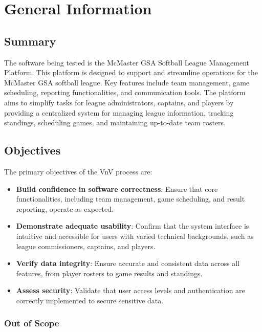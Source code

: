 \documentclass[12pt, titlepage]{article}
\begin{document}
\section{General Information}

\subsection{Summary}

The software being tested is the McMaster GSA Softball League Management Platform. This platform is designed to support and streamline operations for the McMaster GSA softball league. Key features include team management, game scheduling, reporting functionalities, and communication tools. The platform aims to simplify tasks for league administrators, captains, and players by providing a centralized system for managing league information, tracking standings, scheduling games, and maintaining up-to-date team rosters.

\subsection{Objectives}

The primary objectives of the VnV process are:
\begin{itemize}
    \item \textbf{Build confidence in software correctness}: Ensure that core functionalities, including team management, game scheduling, and result reporting, operate as expected.
    \item \textbf{Demonstrate adequate usability}: Confirm that the system interface is intuitive and accessible for users with varied technical backgrounds, such as league commissioners, captains, and players.
    \item \textbf{Verify data integrity}: Ensure accurate and consistent data across all features, from player rosters to game results and standings.
    \item \textbf{Assess security}: Validate that user access levels and authentication are correctly implemented to secure sensitive data.
\end{itemize}

\subsubsection*{Out of Scope}
\end{document}
